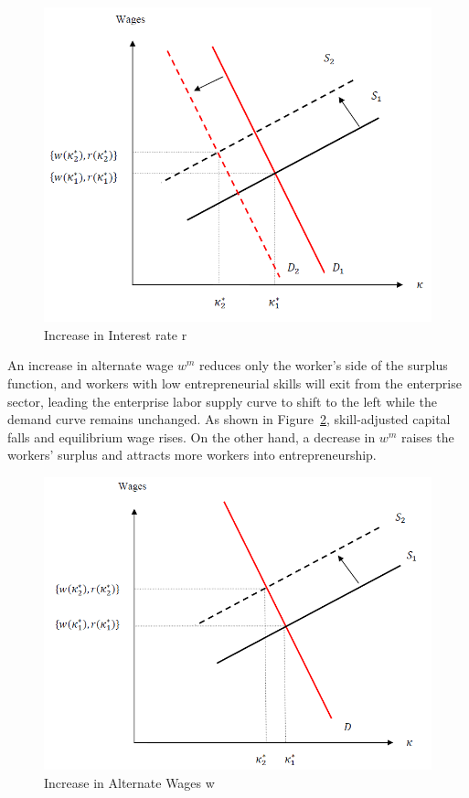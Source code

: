 \documentclass[
  a4paper,
  DIV=11,
  numbers=noendperiod]{scrartcl}
\begin{document}
\begin{figure}

{\centering \includegraphics{figures/figure-11.png}

}

\caption{\label{fig-figure-11}Increase in Interest rate r}

\end{figure}

An increase in alternate wage \(w^m\) reduces only the worker's side of
the surplus function, and workers with low entrepreneurial skills will
exit from the enterprise sector, leading the enterprise labor supply
curve to shift to the left while the demand curve remains unchanged. As
shown in Figure~\ref{fig-figure-12}, skill-adjusted capital falls and
equilibrium wage rises. On the other hand, a decrease in \(w^m\) raises
the workers' surplus and attracts more workers into entrepreneurship.

\begin{figure}

{\centering \includegraphics{figures/figure-12.png}

}

\caption{\label{fig-figure-12}Increase in Alternate Wages w}

\end{figure}
\end{document}
